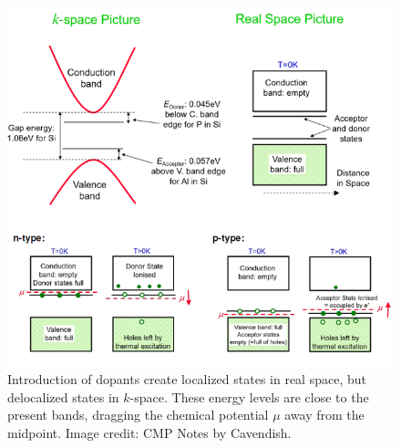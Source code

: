 \documentclass[a4paper]{article}
\begin{document}
\begin{figure}[H]
    \centering
    \includegraphics[width=\linewidth]{doping.PNG}
    \caption{Introduction of dopants create localized states in real space, but delocalized states in $k$-space. These energy levels are close to the present bands, dragging the chemical potential $\mu$ away from the midpoint. Image credit: CMP Notes by Cavendish.}
\end{figure}
\newpage
\end{document}
